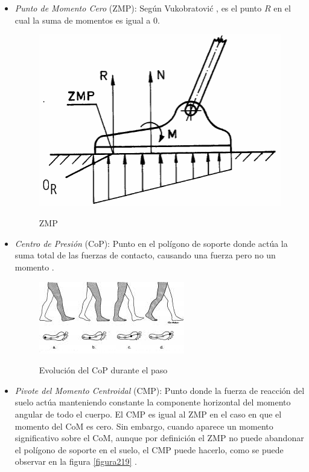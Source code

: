 \begin{itemize}
\item \emph{Punto de Momento Cero} (ZMP): Según Vukobratović \cite{ref19}, es el punto $R$ en el cual la suma de momentos es igual a 0.

\begin{figure}[H]
\centering
{\includegraphics[scale=0.6]{imagenes/apartado_2/217_zmp}}
\caption{ZMP}
\label{figura217}
\end{figure}

\item \emph{Centro de Presión} (CoP): Punto en el polígono de soporte donde actúa la suma total de las fuerzas de contacto, causando una fuerza pero no un momento \cite{ref24}. 

\begin{figure}[H]
\centering
{\includegraphics[scale=1.3]{imagenes/apartado_2/218_cop}}
\caption{Evolución del CoP durante el paso}
\label{figura218}
\end{figure}

\item \emph{Pivote del Momento Centroidal} (CMP): Punto donde la fuerza de reacción del suelo actúa manteniendo constante la componente horizontal del momento angular de todo el cuerpo. El CMP es igual al ZMP en el caso en que el momento del CoM es cero. Sin embargo, cuando aparece un momento significativo sobre el CoM, aunque por definición el ZMP no puede abandonar el polígono de soporte en el suelo, el CMP puede hacerlo, como se puede observar en la figura \ref{figura219} \cite{ref25}.


\end{itemize}
